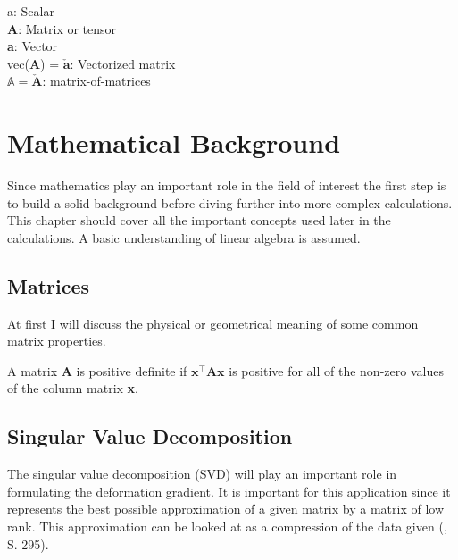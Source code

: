 \begin{addmargin}[1cm]{1cm}
a: Scalar \\
\textbf{A}: Matrix or tensor \\
\textbf{a}: Vector \\
vec(\textbf{A}) = $\mathbf{\check{a}}$: Vectorized matrix \\
$\mathbb{A} = \mathbf{\check{A}}$: matrix-of-matrices
\end{addmargin}




\section{Mathematical Background}
Since mathematics play an important role in the field of interest the first step is to build a solid background before diving further into more complex calculations. This chapter should cover all the important concepts used later in the calculations. A basic understanding of linear algebra is assumed.


\subsection{Matrices}
At first I will discuss the physical or geometrical meaning of some common matrix properties.

A matrix \textbf{A} is positive definite if $\textbf{x}^\intercal \textbf{Ax}$ is positive for all of the non-zero values of the column matrix \textbf{x}.



\subsection{Singular Value Decomposition}

The singular value decomposition (SVD) will play an important role in formulating the deformation gradient. It is important for this application since it represents the best possible approximation of a given matrix by a matrix of low rank. This approximation can be looked at as a compression of the data given (\cite{LiesenMehrmann2015}, S. 295).

